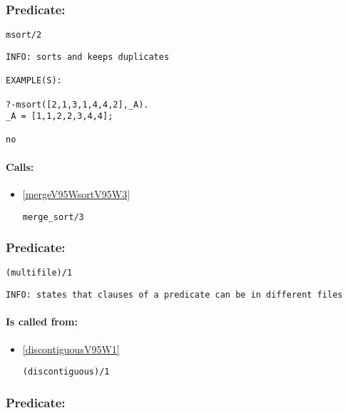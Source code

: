 \subsubsection{Predicate:} \label{msortV95W2}

\begin{verbatim}
msort/2
\end{verbatim}

{\small \begin{verbatim}
INFO: sorts and keeps duplicates

EXAMPLE(S):

?-msort([2,1,3,1,4,4,2],_A).
_A = [1,1,2,2,3,4,4];

no

\end{verbatim}}
\paragraph{Calls:} 
\begin{itemize}
\item \ref{mergeV95WsortV95W3} 
\begin{verbatim}
merge_sort/3
\end{verbatim}

\end{itemize}

\subsubsection{Predicate:} \label{multifileV95W1}

\begin{verbatim}
(multifile)/1
\end{verbatim}

{\small \begin{verbatim}
INFO: states that clauses of a predicate can be in different files

\end{verbatim}}
\paragraph{Is called from:} 
\begin{itemize}
\item \ref{discontiguousV95W1} 
\begin{verbatim}
(discontiguous)/1
\end{verbatim}

\end{itemize}

\subsubsection{Predicate:} \label{nameV95W2}

